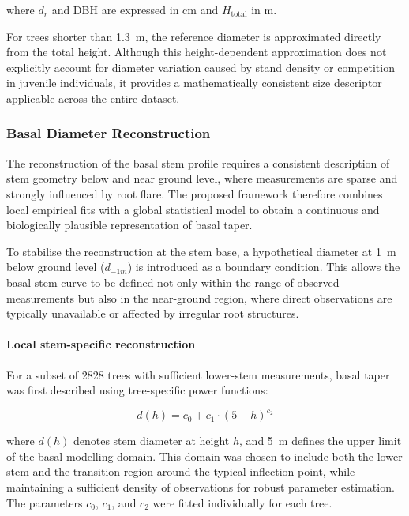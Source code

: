 \documentclass[twocolumn, bibliography=totoc]{scrartcl}
\begin{document}
where $d_r$ and DBH are expressed in \unit{cm} and $H_{\text{total}}$ in \unit{m}.

For trees shorter than \qty{1.3}{m}, the reference diameter is approximated directly from the total height. Although this height-dependent approximation does not explicitly account for diameter variation caused by stand density or competition in juvenile individuals, it provides a mathematically consistent size descriptor applicable across the entire dataset.


\subsubsection{Basal Diameter Reconstruction}

The reconstruction of the basal stem profile requires a consistent description of stem geometry below and near ground level, where measurements are sparse and strongly influenced by root flare. The proposed framework therefore combines local empirical fits with a global statistical model to obtain a continuous and biologically plausible representation of basal taper.

To stabilise the reconstruction at the stem base, a hypothetical diameter at \qty{1}{m} below ground level ($d_{-1m}$) is introduced as a boundary condition. This allows the basal stem curve to be defined not only within the range of observed measurements but also in the near-ground region, where direct observations are typically unavailable or affected by irregular root structures.

\paragraph{Local stem-specific reconstruction}

For a subset of \num{2828} trees with sufficient lower-stem measurements, basal taper was first described using tree-specific power functions:

\begin{equation}
d(h) = c_0 + c_1 \cdot (5 - h)^{c_2}
\end{equation}

where $d(h)$ denotes stem diameter at height $h$, and \qty{5}{m} defines the upper limit of the basal modelling domain. This domain was chosen to include both the lower stem and the transition region around the typical inflection point, while maintaining a sufficient density of observations for robust parameter estimation. The parameters $c_0$, $c_1$, and $c_2$ were fitted individually for each tree.
\end{document}
